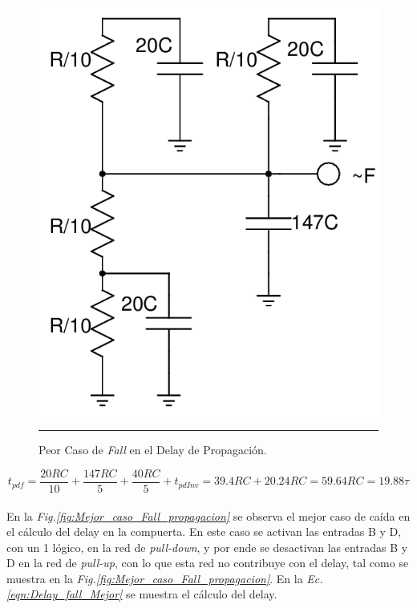 \documentclass[12pt,a4paper]{article} %
\begin{document}
\begin{figure}[htbp]
  \centering
    \includegraphics[scale=0.25]{./Peor_caso_Fall_propagacion.png}
    \rule{35em}{0.3pt}
  \caption[C_Carga]{Peor Caso de \textit{Fall} en el Delay de Propagación.}
  \label{fig:Peor_caso_Fall_propagacion}
\end{figure}


\begin{equation}\label{eqn:Delay_fall_Peor}
t_{pdf} = \frac{20RC}{10}+\frac{147RC}{5}+\frac{40RC}{5}+t_{pdInv}=39.4RC+20.24RC=59.64RC=19.88\tau
\end{equation}\\


En la \textit{Fig.\ref{fig:Mejor_caso_Fall_propagacion}} se observa el mejor caso de caída en el cálculo del delay en la compuerta. En este caso se activan las entradas B y D, con un 1 lógico, en la red de \textit{pull-down}, y por ende se desactivan las entradas B y D en la red de \textit{pull-up}, con lo que esta red no contribuye con el delay, tal como se muestra en la \textit{Fig.\ref{fig:Mejor_caso_Fall_propagacion}}. En la \textit{Ec.\ref{eqn:Delay_fall_Mejor}} se muestra el cálculo del delay.\\
\end{document}

